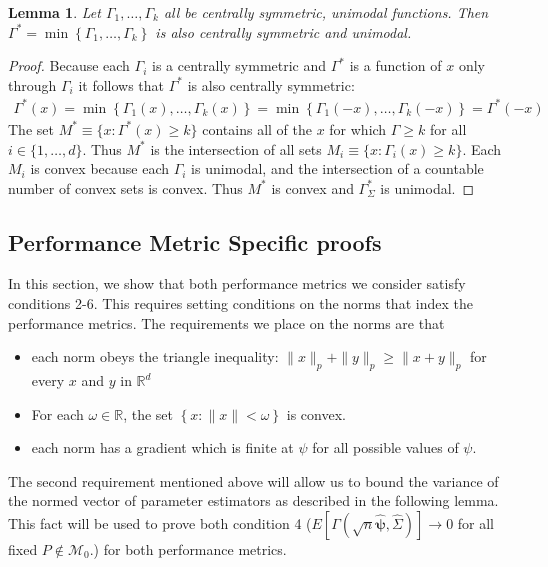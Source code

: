 \documentclass{article}
\newtheorem{lemma}[theorem]{Lemma}
\newcommand{\gi}{\Gamma}
\newcommand{\gamestp}{\Gamma(\sqrt{n}\hat{\boldsymbol{\psi}}, \hat{\Sigma})}
\newcounter{conditions}
\begin{document}
\begin{lemma}
	\label{lemma:min_cent_sym_unm}
	Let $\Gamma_{1}, \dots, \Gamma_{k}$ all be centrally symmetric, unimodal functions.  Then $\Gamma^* = \min\left\{\Gamma_{1}, \dots, \Gamma_{k}\right\}$ is also centrally symmetric and unimodal.
\end{lemma}
\begin{proof}
Because each $\gi_i$ is a centrally symmetric and $\gi^*$ is a function of $x$ only through $\gi_i$ it follows that $\gi^*$ is also centrally symmetric:
	\begin{align*}
	\gi^*(x) = \min\left\{\gi_1(x), \dots, \gi_k(x)\right\} = \min\left\{\gi_1(-x), \dots, \gi_k(-x)\right\} = \gi^*(-x)
	\end{align*}
The set $M^* \equiv \{x : \Gamma^*(x) \geq k\}$ contains all of the $x$ for which $\Gamma \geq k$ for all $i \in \{1, \dots, d\}$.  Thus $M^*$ is the intersection of all sets $M_i \equiv \{x : \Gamma_{i}(x) \geq k\}$.  Each $M_i$ is convex because each $\Gamma_{i}$ is unimodal, and the intersection of a countable number of convex sets is convex.  Thus $M^*$ is convex and $\Gamma_{\Sigma}^*$ is unimodal.
\end{proof}


\subsection*{Performance Metric Specific proofs}
In this section, we show that both performance metrics we consider satisfy conditions 2-6. This requires setting conditions on the norms that index the performance metrics. The requirements we place on the norms are that
\begin{itemize}
	\item each norm obeys the triangle inequality: $\|x\|_p + \|y\|_p \geq \|x + y\|_p$ for every $x$ and $y$ in $\mathbb{R}^d$
	\item For each $\omega \in \mathbb{R}$, the set $\left\{x : \|x\| < \omega\right\}$ is convex.
	\item each norm has a gradient which is finite at $\psi$ for all possible values of $\psi$.
\end{itemize}

The second requirement mentioned above will allow us to bound the variance of the normed vector of parameter estimators as described in the following lemma.  This fact will be used to prove both condition 4 ($E\left[\gamestp \right] \rightarrow 0$ for all fixed $P \not \in \mathcal{M}_0$.) for both performance metrics.  
\end{document}
